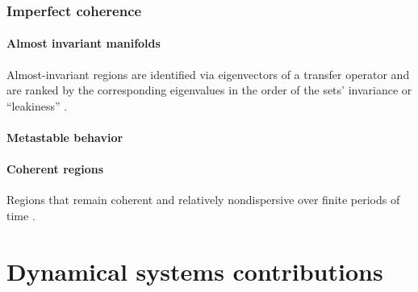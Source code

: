 \documentclass{article}
\theoremstyle{definition} \newtheorem{definition}{Definition}  \newtheorem{example}{Example}
\theoremstyle{remark} \newtheorem{remark}{Remark}
\newcounter{ct}
\begin{document}
\subsubsection{Imperfect coherence}%
\paragraph{Almost invariant manifolds}
 Almost-invariant regions are identified via eigenvectors of a transfer operator and are ranked by the corresponding eigenvalues in the order of the sets' invariance or ``leakiness'' \citep{froyland2009almost}.
    
    
    
\paragraph{Metastable behavior}\label{sec:metastable}
   \citep{brinkman2022metastable}
    
    
\paragraph{Coherent regions}
Regions that remain coherent and relatively nondispersive over finite periods of time \citep{fackeldey2019metastable}.






\newpage
\section{Dynamical systems contributions}\label{sec:fojac}
\end{document}
